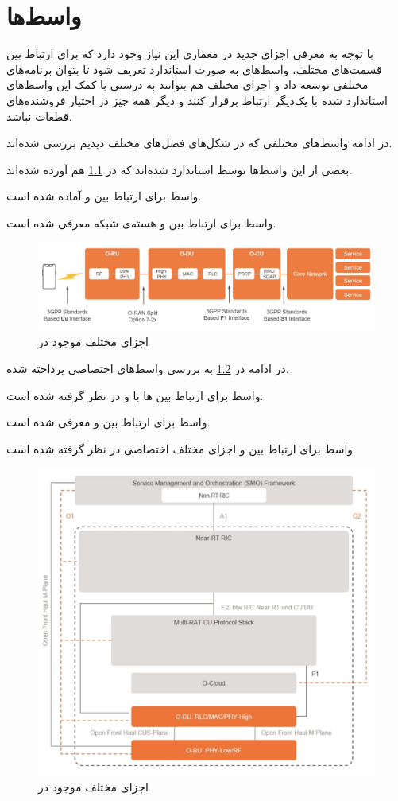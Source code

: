 \chapter{واسط‌ها}

با توجه به معرفی اجزای جدید در معماری 
این نیاز وجود دارد که برای ارتباط بین قسمت‌های مختلف، واسط‌های به صورت استاندارد تعریف شود تا بتوان برنامه‌های مختلفی توسعه داد و اجزای مختلف هم بتوانند به درستی با کمک این واسط‌های استاندارد شده با یک‌دیگر ارتباط برقرار کنند و دیگر همه چیز در اختیار فروشنده‌های قطعات نباشد.

در ادامه واسط‌های مختلفی که در شکل‌های فصل‌های مختلف دیدیم بررسی شده‌اند.

بعضی از این واسط‌ها توسط 
استاندارد شده‌اند که در 
\ref{fig:int1}
هم آورده شده‌اند. 

واسط
برای ارتباط بین
و
آماده شده است.

واسط
برای ارتباط بین
و هسته‌ی شبکه معرفی شده است.

\begin{figure}[H]
	\includegraphics[width=0.85\columnwidth]{Picture/int1.png}
	\centering
	\caption{اجزای مختلف موجود در
		}
	\label{fig:int1}
\end{figure}

در ادامه در 
\ref{fig:int2}
به بررسی واسط‌های اختصاصی
پرداخته شده.

واسط
برای ارتباط بین
ها
با 
و
در نظر گرفته شده است.

واسط
برای ارتباط بین
و 
 معرفی شده است.

واسط
برای ارتباط بین
‌و اجزای مختلف اختصاصی 
در نظر گرفته شده است.

\begin{figure}[H]
	\includegraphics[width=0.85\columnwidth]{Picture/int2.png}
	\centering
	\caption{اجزای مختلف موجود در
		}
	\label{fig:int2}
\end{figure}